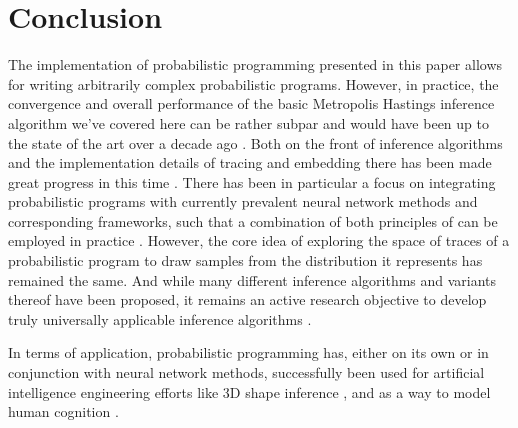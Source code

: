 \section{Conclusion}

The implementation of probabilistic programming presented in this paper allows for writing arbitrarily complex probabilistic programs. However, in practice, the convergence and overall performance of the basic Metropolis Hastings inference algorithm we've covered here can be rather subpar and would have been up to the state of the art over a decade ago \cite{wingate2011lightweight}. Both on the front of inference algorithms and the implementation details of tracing and embedding there has been made great progress in this time \cite{wood2014new} \cite{cusumano2019gen}. There has been in particular a focus on integrating probabilistic programs with currently prevalent neural network methods and corresponding frameworks, such that a combination of both principles of can be employed in practice \cite{bingham2019pyro} \cite{cusumano2019gen}. However, the core idea of exploring the space of traces of a probabilistic program to draw samples from the distribution it represents has remained the same. And while many different inference algorithms and variants thereof have been proposed, it remains an active research objective to develop truly universally applicable inference algorithms \cite{lew2023smcp3}.

In terms of application, probabilistic programming has, either on its own or in conjunction with neural network methods, successfully been used for artificial intelligence engineering efforts like 3D shape inference \cite{mansinghka2013approximate} \cite{hoffman2023probnerf}, and as a way to model human cognition \cite{griffiths2010probabilistic} \cite{stuhlmuller2015modeling}.
